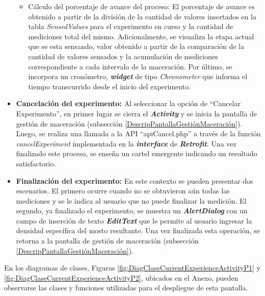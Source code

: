 \begin{itemize}
\begin{itemize}
                    \item Cálculo del porcentaje de avance del proceso: El porcentaje de avance es obtenido a partir de la división de la cantidad de valores insertados en la tabla \textit{SensedValues} para el experimento en curso y la cantidad de mediciones total del mismo. Adicionalmente, se visualiza la etapa actual que se esta sensando, valor obtenido a partir de la comparación de la cantidad de valores sensados y la acumulación de mediciones correspondiente a cada intervalo de la maceración. Por último, se incorpora un cronómetro, \textbf{\textit{widget}} de tipo \textit{Chronometer} que informa el tiempo transcurrido desde el inicio del experimento.
                    
                \end{itemize}
               
                \item \textbf{Cancelación del experimento:} Al seleccionar la opción de ``Cancelar Experimento'', en primer lugar se cierra el \textbf{\textit{\gls{Activity}}} y se inicia la pantalla de gestión de maceración (subsección \ref{DescripPantallaGestiónMaceración}). Luego, se realiza una llamada a la API ``apiCancel.php'' a través de la función \textit{cancelExperiment} implementada en la \textbf{\textit{interface}} de \textbf{\textit{\gls{Retrofit}}}. Una vez finalizado este proceso, se enseña un cartel emergente indicando un resultado satisfactorio.
                
                \item \textbf{Finalización del experimento:} En este contexto se pueden presentar dos escenarios. El primero ocurre cuando no se obtuvieron aún todas las mediciones y se le indica al usuario que no puede finalizar la medición. El segundo, ya finalizado el experimento, se muestra un \textbf{\textit{\gls{AlertDialog}}} con un campo de inserción de texto \textbf{\textit{\gls{EditText}}} que le permite al usuario ingresar la densidad específica del mosto resultante. Una vez finalizada esta operación, se retorna a la pantalla de gestión de maceración (subsección \ref{DescripPantallaGestiónMaceración}).

            \end{itemize}
             
            
            \par En los diagramas de clases, Figuras \ref{fig:DiagClaseCurrentExperienceActivityP1} y \ref{fig:DiagClaseCurrentExperienceActivityP2}, ubicados en el Anexo, pueden observarse las clases y funciones utilizadas para el despliegue de esta pantalla.
    
